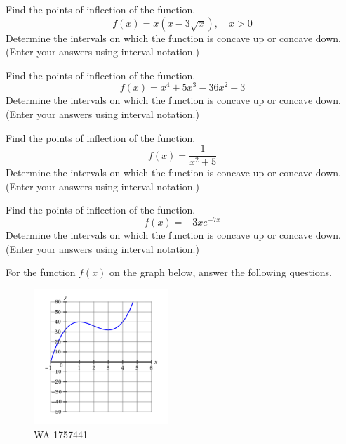 \documentclass[12pt,addpoints, answers, fleqn]{exam}
\begin{document}
\begin{teacher}
\begin{questions}
\question 	%

Find the points of inflection of the function.
\[
f\left(x\right) = x\left(x - 3 \sqrt{x} \right), \quad x > 0
\]
Determine the intervals on which the function is concave up or concave down. (Enter your answers using interval notation.)
\begin{solution}
\end{solution}

\question 	%

Find the points of inflection of the function.
\[
f\left(x\right) = x^4 + 5x^3 - 36x^2 + 3
\]
Determine the intervals on which the function is concave up or concave down. (Enter your answers using interval notation.)
\begin{solution}
\end{solution}

\question 	%

Find the points of inflection of the function.
\[
f\left(x\right) = \frac{1}{x^2+5}
\]
Determine the intervals on which the function is concave up or concave down. (Enter your answers using interval notation.)
\begin{solution}
\end{solution}

\question 	%

Find the points of inflection of the function.
\[
f\left(x\right) = -3xe^{-7x}
\]
Determine the intervals on which the function is concave up or concave down. (Enter your answers using interval notation.)
\begin{solution}
\end{solution}


\question 	%

For the function $f\left(x\right)$ on the graph below, answer the following questions.
 
 \begin{figure}[htbp] %
   \centering
   \includegraphics[width=2in]{./graphics/1757441.pdf} 
   \caption{WA-1757441}
   \label{fig:1757441}
\end{figure}


\end{questions}
\end{teacher}
\end{document}
